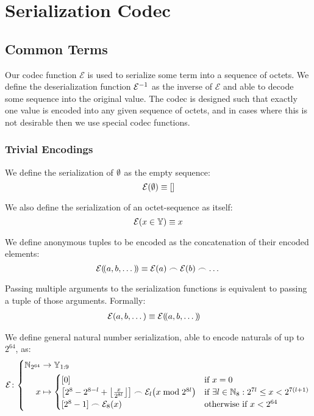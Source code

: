 \section{Serialization Codec}\label{sec:serialization}

\subsection{Common Terms}

Our codec function $\mathcal{E}$ is used to serialize some term into a sequence of octets. We define the deserialization function $\mathcal{E}^{-1}$ as the inverse of $\mathcal{E}$ and able to decode some sequence into the original value. The codec is designed such that exactly one value is encoded into any given sequence of octets, and in cases where this is not desirable then we use special codec functions.

\subsubsection{Trivial Encodings}
We define the serialization of $\emptyset$ as the empty sequence:
\begin{equation}
  \encode{\none} \equiv []
\end{equation}

We also define the serialization of an octet-sequence as itself:
\begin{equation}
  \encode{x \in \blob} \equiv x
\end{equation}

We define anonymous tuples to be encoded as the concatenation of their encoded elements:
\begin{equation}
  \encode{\tup{a, b, \dots}} \equiv \encode{a} \concat \encode{b} \concat \dots
\end{equation}

Passing multiple arguments to the serialization functions is equivalent to passing a tuple of those arguments. Formally:
\begin{align}
  \encode{a, b, \dots} &\equiv \encode{\tup{a, b, \dots}}
\end{align}

We define general natural number serialization, able to encode naturals of up to $2^{64}$, as:
\begin{equation}
  \fnencode\colon\abracegroup{
    \Nbits{64} &\to \bloboflen{1:9} \\
    x &\mapsto \begin{cases}
      [0] &\when x = 0 \\
      \left[2^8-2^{8-l} + \ffrac{x}{2^{8l}}\right] \concat \fixedencode{l}{x \bmod 2^{8l}} &\when \exists l \in \N_8 : 2^{7l} \le x < 2^{7(l+1)} \\
      [2^8-1] \concat \fixedencode{8}{x} &\otherwhen x < 2^{64} \\
    \end{cases}
  }
\end{equation}

